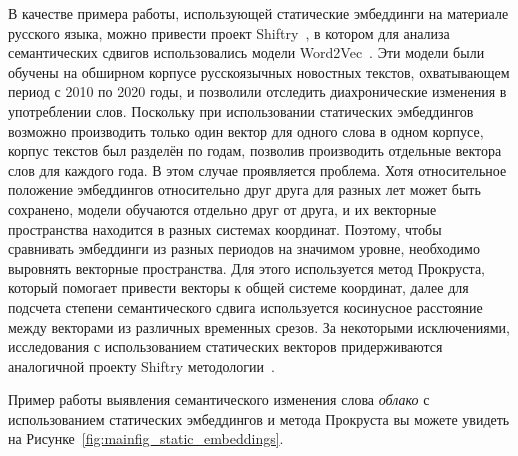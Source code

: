 \documentclass[LI,VKR]{HSEUniversity}
\begin{document}
В качестве примера работы, использующей статические эмбеддинги на материале русского языка,
можно привести проект Shiftry~\cite{shiftry},
в котором для анализа семантических сдвигов использовались модели Word2Vec~\cite{Word2VecModelAnalysis}.
Эти модели были обучены на обширном корпусе русскоязычных новостных текстов,
охватывающем период с 2010 по 2020 годы, и позволили отследить диахронические изменения
в употреблении слов.
Поскольку при использовании статических эмбеддингов возможно производить
только один вектор для одного слова в одном корпусе,
корпус текстов был разделён по годам,
позволив производить отдельные вектора слов для каждого года.
В этом случае проявляется проблема.
Хотя относительное положение эмбеддингов относительно друг друга для разных лет может быть сохранено,
модели обучаются отдельно друг от друга,
и их векторные пространства находится в разных системах координат.
Поэтому, чтобы сравнивать эмбеддинги из разных периодов на значимом уровне,
необходимо выровнять векторные пространства.
Для этого используется метод Прокруста, который помогает привести векторы к общей системе координат,
далее для подсчета степени семантического сдвига используется косинусное расстояние между
векторами из различных временных срезов.
За некоторыми исключениями, исследования с использованием статических векторов
придерживаются аналогичной проекту Shiftry методологии~\cite{TahmasebiComputationalApproachesToSemanticChange}.

Пример работы выявления семантического изменения слова \textit{облако} с использованием
статических эмбеддингов и метода Прокруста вы можете увидеть на Рисунке~\ref{fig:mainfig_static_embeddings}.
\end{document}
